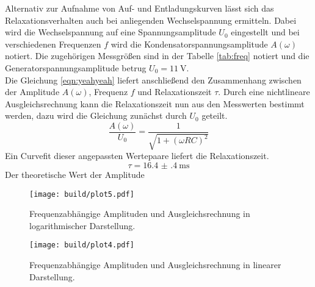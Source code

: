 Alternativ zur Aufnahme von Auf- und Entladungskurven lässt sich das Relaxationsverhalten auch bei anliegenden Wechselspannung ermitteln.
Dabei wird die Wechselspannung auf eine Spannungsamplitude $U_{0}$ eingestellt und bei verschiedenen Frequenzen $f$ wird die Kondensatorspannungsamplitude $A(\omega)$ notiert.
Die zugehörigen Messgrößen sind in der Tabelle \ref{tab:freq} notiert und die Generatorspannungsamplitude betrug $U_{0} = \SI{11}{\volt}$.
\\
Die Gleichung \eqref{eqn:yeahyeah} liefert anschließend den Zusammenhang zwischen der Amplitude $A(\omega)$, Frequenz $f$ und Relaxationszeit $\tau$.
Durch eine nichtlineare Ausgleichsrechnung kann die Relaxationszeit nun aus den Messwerten bestimmt werden, dazu wird die Gleichung zunächst durch $U_{0}$ geteilt.
\begin{equation}
    \frac{A(\omega)}{U_{0}} = \frac{1}{\sqrt{1+(\omega RC)^{2}}}
\end{equation}
Ein Curvefit dieser angepassten Wertepaare liefert die Relaxationszeit.
\begin{equation*}
\tau = \SI{16.4(4)}{\milli\second}
\end{equation*}
Der theoretische Wert der Amplitude 
\begin{figure}
    \centering 
    \texttt{[image: build/plot5.pdf]}
    \caption{Frequenzabhängige Amplituden und Ausgleichsrechnung in logarithmischer Darstellung.}
    \label{plt:plot5}
\end{figure} 

\begin{figure}
    \centering 
    \texttt{[image: build/plot4.pdf]}
    \caption{Frequenzabhängige Amplituden und Ausgleichsrechnung in linearer Darstellung.}
    \label{plt:plot4}
\end{figure} 

